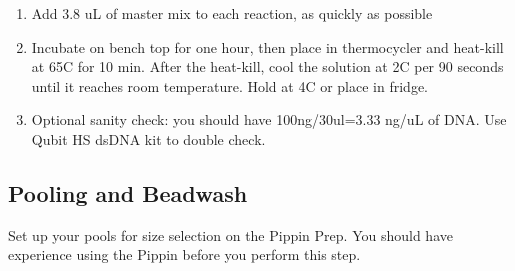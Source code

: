 \documentclass[11pt, oneside]{article}
\begin{document}
\begin{enumerate}
			\item Add 3.8 uL of master mix to each reaction, as quickly as possible
			\item Incubate on bench top for one hour, then place in thermocycler and heat-kill at 65C for 10 min. After the heat-kill, cool the solution at 2C per 90 seconds until it reaches room temperature. Hold at 4C or place in fridge.  
			
			\item Optional sanity check: you should have 100ng/30ul=3.33 ng/uL of DNA.  Use Qubit HS dsDNA kit to double check.
			
		\end{enumerate}

			\newpage
			
\subsection{Pooling and Beadwash}
	Set up your pools for size selection on the Pippin Prep.  You should have experience using the Pippin before you perform this step.
\end{document}
